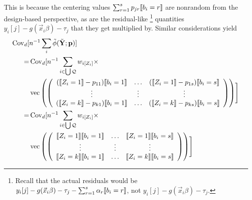 \documentclass{article}
\DeclarePairedDelimiter{\indicator}{\llbracket}{\rrbracket}
\newcommand{\owt}[1][z_i]{\ensuremath{w_{i[#1]}}}
\begin{document}
This is because the centering values
$\sum_{r=1}^{s}p_{jr}\indicator{b_{i}=r}$ are nonrandom from the
design-based perspective, as are the residual-like%
\footnote{Recall that the actual residuals would be $y_{i}[j] -
  g(\vec{x}_{i}\beta) - \tau_{j} - \sum_{r=1}^{s}\alpha_{r}\indicator{b_{i}=r}$, not $y_{i}[j] - g(\vec{x}_{i}\beta) - \tau_{j}$.}
quantities
$y_{i}[j] - g(\vec{x}_{i}\beta) - \tau_{j}$ that they get
multiplied by.  Similar  considerations yield
\begin{align}
\operatorname{Cov}_{d}[
  &n^{-1}\sum_{i}\tilde{\phi}(\tilde{\mathbf{Y}}; \mathbf{p})] \nonumber\\
  =&\operatorname{Cov}_{d}[n^{-1}
                                                 \sum_{i \in \bigcup
     \mathcal{Q}} \owt[Z_{i}] \times \nonumber \\
&  \operatorname{vec}\left(%
                                                 \left(
                                                 \begin{array}{ccc}
                                                   (\indicator{Z_{i}=1}-p_{11})\indicator{b_{i}=1}&\ldots&(\indicator{Z_{i}=1}-p_{1s})\indicator{b_{i}=s}\\
                                                   \vdots & \vdots &
                                                                     \vdots
                                                   \\
                                                   (\indicator{Z_{i}=k}-p_{k1})\indicator{b_{i}=1}&\ldots&(\indicator{Z_{i}=k}-p_{ks})\indicator{b_{i}=s}\\                                                   
                                                 \end{array}
  \right)%
  \right)
  \Biggr] \nonumber \\ 
  =&\operatorname{Cov}_{d}[n^{-1}
                                                 \sum_{i \in \bigcup
     \mathcal{Q}} \owt[Z_{i}] \times \nonumber \\
  &\operatorname{vec}\left(%
                                                 \left(
                                                 \begin{array}{ccc}
                                                   \indicator{Z_{i}=1}\indicator{b_{i}=1}&\ldots&\indicator{Z_{i}=1}\indicator{b_{i}=s}\\
                                                   \vdots & \vdots &
                                                                     \vdots
                                                   \\
                                                   \indicator{Z_{i}=k}\indicator{b_{i}=1}&\ldots&\indicator{Z_{i}=k}\indicator{b_{i}=s}\\                                                   
                                                 \end{array}  
  \right)%
  \right)
    \Biggr] \label{eq:11}
\end{align}
\end{document}

